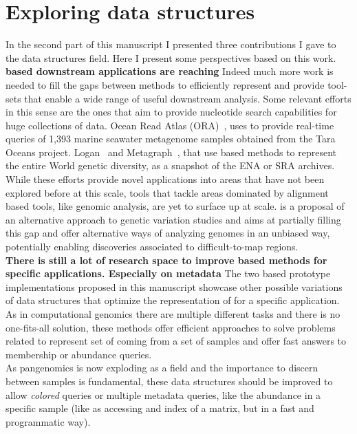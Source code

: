 \section{Exploring \kmer data structures}
In the second part of this manuscript I presented three contributions I gave to the \kmer data structures field. Here I present some perspectives based on this work.
\textbf{\kmer based downstream applications are reaching}
Indeed much more work is needed to fill the gaps between methods to efficiently represent \kmers and provide tool-sets that enable a wide range of useful downstream analysis. Some relevant efforts in this sense are the ones that aim to provide nucleotide search capabilities for huge collections of data. Ocean Read Atlas (ORA)~\cite{ora}, uses \kmtricks to provide real-time queries of 1,393 marine seawater metagenome samples obtained from the Tara Oceans project. Logan~\cite{logan} and Metagraph~\cite{metagraph}, that use \kmer based methods to represent the entire World genetic diversity, as a snapshot of the ENA or SRA archives.\\
While these efforts provide novel applications into areas that have not been explored before at this scale, tools that tackle areas dominated by alignment based tools, like genomic analysis, are yet to surface up at scale. \muset is a proposal of an alternative approach to genetic variation studies and aims at partially filling this gap and offer alternative ways of analyzing genomes in an unbiased way, potentially enabling discoveries associated to difficult-to-map regions.\\
\textbf{There is still a lot of research space to improve \kmer based methods for specific applications. Especially on metadata}
The two \kmer based prototype implementations proposed in this manuscript showcase other possible variations of data structures that optimize the representation of \kmers for a specific application. As in computational genomics there are multiple different tasks and there is no one-fits-all solution, these methods offer efficient approaches to solve problems related to represent set of \kmers coming from a set of samples and offer fast answers to membership or abundance queries.\\
As pangenomics is now exploding as a field and the importance to discern between samples is fundamental, these data structures should be improved to allow \emph{colored} queries or multiple metadata queries, like the abundance in a specific sample (like as accessing and index of a \muset matrix, but in a fast and programmatic way).